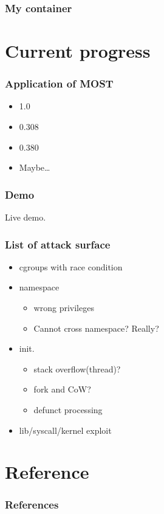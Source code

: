 \documentclass{beamer}
\begin{document}
\begin{frame}
    \frametitle{My container}
    
    
\end{frame}


\section{Current progress}
\begin{frame}
    \frametitle{Application of MOST}
    \begin{itemize}
        \item {}  1.0
        \item {}  0.308
        \item {}  0.380
        \item {}  Maybe\dots
    \end{itemize}
\end{frame}

\begin{frame}
    \frametitle{Demo}
    \centering Live demo.
\end{frame}

\begin{frame}
    \frametitle{List of attack surface}
    \begin{itemize}
        \item cgroups with race condition
        \item namespace
              \begin{itemize}
                  \item wrong privileges
                  \item Cannot cross namespace? Really?
              \end{itemize}
        \item init.
              \begin{itemize}
                  \item stack overflow(thread)?
                  \item fork and CoW?
                  \item defunct processing
              \end{itemize}
        \item lib/syscall/kernel exploit
    \end{itemize}
\end{frame}

\section{Reference}
\begin{frame}[t, allowframebreaks]
    \frametitle{References}
    \printbibliography
\end{frame}
\end{document}
